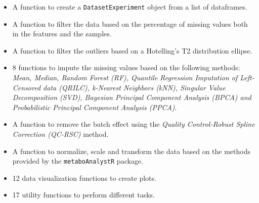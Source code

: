 \documentclass[ENG, BIB]{TFUOC}%
\begin{document}
\begin{itemize}    
    \item A function to create a \texttt{DatasetExperiment} object from a list of dataframes.
    \item A function to filter the data based on the percentage of missing values both in the features and the samples.  
    \item A function to filter the outliers based on a Hotelling's T2 distribution ellipse.
    \item 8 functions to impute the missing values based on the following methods: \textit{Mean, Median, Random Forest (RF), Quantile Regression Imputation of Left-Censored data (QRILC), k-Nearest Neighbors (kNN), Singular Value Decomposition (SVD), Bayesian Principal Component Analysis (BPCA) and Probabilistic Principal Component Analysis (PPCA)}.
    \item A function to remove the batch effect using the \textit{Quality Control-Robust Spline Correction (QC-RSC)} method. 
    \item A function to normalize, scale and transform the data based on the methods provided by the \texttt{metaboAnalystR} package.
    \item 12 data visualization functions to create plots. 
    \item 17 utility functions to perform different tasks. 
\end{itemize}
    
\end{document}
